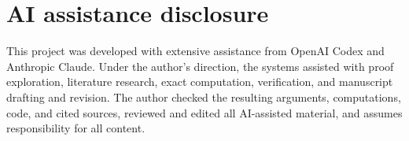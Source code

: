 \documentclass[11pt]{article}
\theoremstyle{definition}
\theoremstyle{remark}
\begin{document}











\section*{AI assistance disclosure}

This project was developed with extensive assistance from OpenAI Codex and
Anthropic Claude. Under the author's direction, the systems assisted with
proof exploration, literature research, exact computation, verification,
and manuscript drafting and revision. The author checked the resulting
arguments, computations, code, and cited sources, reviewed and edited all
AI-assisted material, and assumes responsibility for all content.



\end{document}
